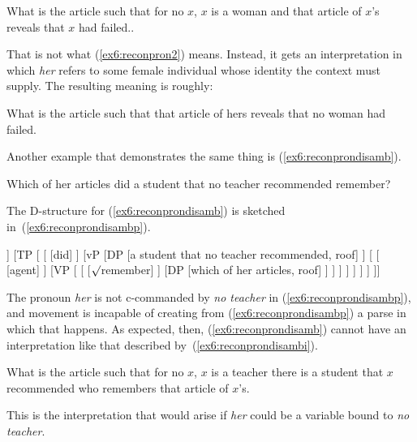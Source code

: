 \begin{exe}
\raggedright
	\ex \label{ex6:reconpron2i}
	What is the article such that for no $x$, $x$ is a woman and that article of $x$'s reveals that $x$ had failed..
\end{exe}
That is not what (\ref{ex6:reconpron2}) means. Instead, it gets an interpretation in which \emph{her} refers to some female individual whose identity the context must supply. The resulting meaning is roughly:
\begin{exe}
\raggedright
	\ex \label{ex6:reconpron2ib}
	What is the article such that that article of hers reveals that no woman had failed.
\end{exe}

Another example that demonstrates the same thing is (\ref{ex6:reconprondisamb}).
\begin{exe}
\raggedright
	\ex \label{ex6:reconprondisamb}
	Which of her articles did a student that no teacher recommended remember? 
\end{exe}
The D-structure for (\ref{ex6:reconprondisamb}) is sketched in~(\ref{ex6:reconprondisambp}).
\begin{exe}
\raggedright
	\ex \label{ex6:reconprondisambp}
	\small
	\begin{forest}
	[CP [\ibar{C}
		[\obar{C} [Q] ]
		[TP [
			[ [did] ]
			[vP
				[DP [a student that no teacher recommended, roof]
				 ]
				[
					[ [agent] ]
					[VP [
						[ ]
						[DP [which of her articles, roof] ]
					] ]
				 ]
			 ]
		] ]
	]]
	\end{forest}
\end{exe}
The pronoun \emph{her} is not c-commanded by \emph{no teacher} in (\ref{ex6:reconprondisambp}), and movement is incapable of creating from (\ref{ex6:reconprondisambp}) a parse in which that happens. As expected, then, (\ref{ex6:reconprondisamb}) cannot have an interpretation like that described by~(\ref{ex6:reconprondisambi}).
\begin{exe}
\raggedright
	\ex \label{ex6:reconprondisambi}
	What is the article such that for no $x$, $x$ is a teacher there is a student that $x$ recommended who remembers that article of $x$'s.
\end{exe}
This is the interpretation that would arise if \emph{her} could be a variable bound to \emph{no teacher}. 


